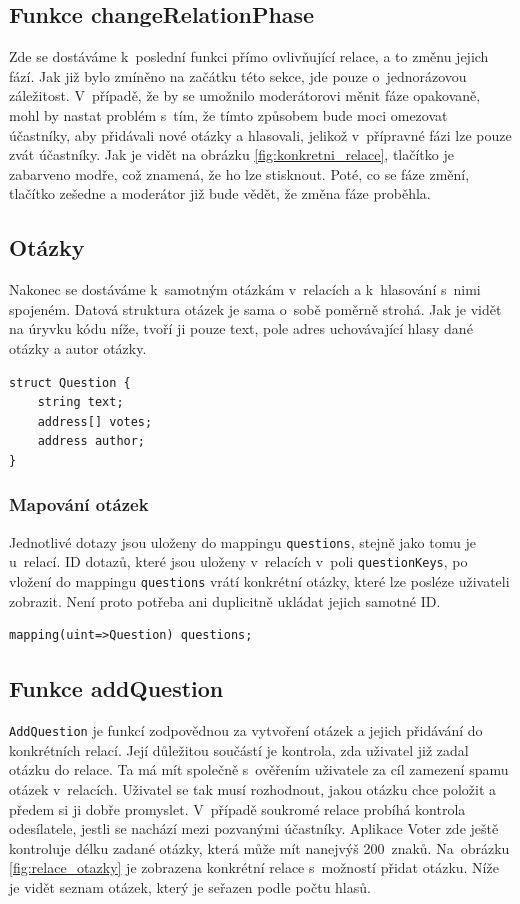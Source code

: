 \subsection*{Funkce changeRelationPhase}
Zde se dostáváme k~poslední funkci přímo ovlivňující relace, a to změnu jejich fází. Jak již bylo zmíněno na začátku této sekce, jde pouze o~jednorázovou záležitost. V~případě, že by se umožnilo moderátorovi měnit fáze opakovaně, mohl by nastat problém s~tím, že tímto způsobem bude moci omezovat účastníky, aby přidávali nové otázky a hlasovali, jelikož v~přípravné fázi lze pouze zvát účastníky. Jak je vidět na obrázku \ref{fig:konkretni_relace}, tlačítko je zabarveno modře, což znamená, že ho lze stisknout. Poté, co se fáze změní, tlačítko zešedne a moderátor již bude vědět, že změna fáze proběhla.

\subsection{Otázky}
Nakonec se dostáváme k~samotným otázkám v~relacích a k~hlasování s~nimi spojeném. Datová struktura otázek je sama o~sobě poměrně strohá. Jak je vidět na úryvku kódu níže, tvoří ji pouze text, pole adres uchovávající hlasy dané otázky a autor otázky.

\begin{verbatim}
struct Question {
    string text;
    address[] votes;
    address author;
}
\end{verbatim}  

\subsubsection*{Mapování otázek}
Jednotlivé dotazy jsou uloženy do mappingu \texttt{questions}, stejně jako tomu je u~relací. ID dotazů, které jsou uloženy v~relacích v~poli \texttt{questionKeys}, po vložení do mappingu \texttt{questions} vrátí konkrétní otázky, které lze posléze uživateli zobrazit. Není proto potřeba ani duplicitně ukládat jejich samotné ID.

\begin{verbatim}
mapping(uint=>Question) questions;
\end{verbatim} 

\subsection*{Funkce addQuestion}
\texttt{AddQuestion} je funkcí zodpovědnou za vytvoření otázek a jejich přidávání do konkrétních relací. Její důležitou součástí je kontrola, zda uživatel již zadal otázku do relace. Ta má mít společně s~ověřením uživatele za cíl zamezení spamu otázek v~relacích. Uživatel se tak musí rozhodnout, jakou otázku chce položit a předem si ji dobře promyslet. V~případě soukromé relace probíhá kontrola odesílatele, jestli se nachází mezi pozvanými účastníky. Aplikace Voter zde ještě kontroluje délku zadané otázky, která může mít nanejvýš 200~znaků. Na~obrázku \ref{fig:relace_otazky} je zobrazena konkrétní relace s~možností přidat otázku. Níže je vidět seznam otázek, který je seřazen podle počtu hlasů. 

